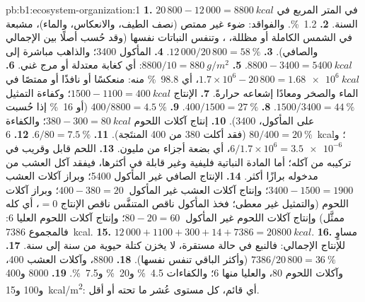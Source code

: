 \begin{solution}{pb:b1:ecosystem-organization:1}
\textbf{1.} $20\,800 - 12\,000 = \qty{8800}{kcal}$ في المتر المربع في
السنة.
\textbf{2.} \qty{1.2}{\%}. والفواقد: ضوء غير ممتص (نصف
الطيف، والانعكاس، والماء)،  مشبعة في الشمس الكاملة أو مظللة،
، وتنفس النباتات نفسها (وقد حُسب أصلًا
بين الإجمالي والصافي).
\textbf{3.} $12\,000/20\,800 = \qty{58}{\%}$.
\textbf{4.} المأكول \qty{3400}{}؛ والذاهب مباشرة إلى 
$8800 - 3400 = \qty{5400}{kcal}$.
\textbf{5.} $8800/10 = \qty{880}{g/m^2}$: أي كغابة معتدلة أو
مرج غني.
\textbf{6.} $1.7\times 10^6 - 20\,800 = \qty{1.68e6}{kcal}$، أي \qty{98.8}{\%}
منه: منعكسًا أو نافذًا أو ممتصًا في الماء والصخر
ومعادًا إشعاعه حرارةً.
\textbf{7.} الإنتاج $1500 - 1100 = \qty{400}{kcal}$؛ وكفاءة التمثيل
$1500/3400 = \qty{44}{\%}$.
\textbf{8.} $400/1500 = \qty{27}{\%}$.
\textbf{9.} $400/8800 = \qty{4.5}{\%}$ (أو \qty{16}{\%} إذا حُسبت على
المأكول، \qty{3400}{}).
\textbf{10.} إنتاج آكلات اللحوم $380 - 300 = \qty{80}{kcal}$؛
والكفاءة $80/400 = \qty{20}{\%}$ (فقد أكلت \qty{380}{} من
\qty{400}{} المنتَجة).
\textbf{11.} $6/80 = \qty{7.5}{\%}$.
\textbf{12.} \qty{6}{kcal}؛ و$6/1.7\times 10^6 = \num{3.5e-6}$، أي بضعة
أجزاء من مليون.
\textbf{13.} اللحم قابل  وقريب في تركيبه من آكله؛
أما المادة النباتية فليفية وغير قابلة  في أكثرها، فيفقد آكل
العشب من مدخوله برازًا أكثر.
\textbf{14.} الإنتاج الصافي غير المأكول \qty{5400}{}؛ وبراز آكلات العشب
$3400 - 1500 = \qty{1900}{}$؛ وإنتاج آكلات العشب غير المأكول
$400 - 380 = \qty{20}{}$؛ وبراز آكلات اللحوم (والتمثيل غير معطى؛
فخذ المأكول ناقص المتنفَّس ناقص الإنتاج $= 0$، أي كله ممثَّل)
وإنتاج آكلات اللحوم غير المأكول $80 - 20 = \qty{60}{}$؛ وإنتاج آكلات
اللحوم العليا \qty{6}{}: فالمجموع \qty{7386}{kcal}.
\textbf{15.} $12\,000 + 1100 + 300 + 14 + 7386 = \qty{20800}{kcal}$.
\textbf{16.} مساوٍ للإنتاج الإجمالي: فالنبع في حالة
مستقرة، لا يخزن كتلة حيوية من سنة إلى سنة.
\textbf{17.} $7386/20\,800 = \qty{36}{\%}$ (وأكثر الباقي تنفس
 نفسها).
\textbf{18.}  \qty{8800}{}، وآكلات العشب \qty{400}{}، وآكلات اللحوم
\qty{80}{}، والعليا منها \qty{6}{}؛ والكفاءات \qty{4.5}{\%}
و\qty{20}{\%} و\qty{7.5}{\%}.
\textbf{19.} \qty{8000}{} و\qty{400}{} و\qty{100}{} و\qty{15}{kcal/m^2}:
أي قائم، كل مستوى عُشر ما تحته أو أقل.

\end{solution}

